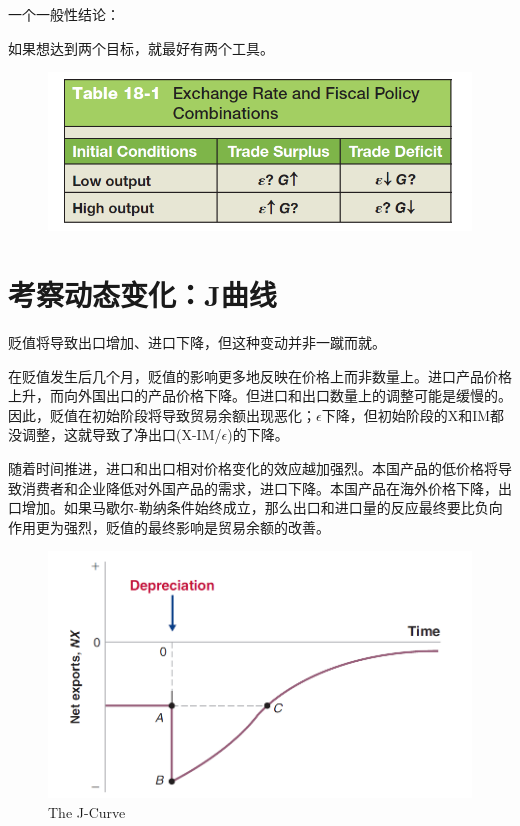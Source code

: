 \documentclass{article}
\begin{document}
\hspace*{\fill}

一个一般性结论：

如果想达到两个目标，就最好有两个工具。

\begin{figure}[H] %
	\centering %
	\includegraphics[width=1\textwidth]{18_8} %
	\caption{} %
	\label{Fig.main8} %
\end{figure}

\section{考察动态变化：J曲线}

贬值将导致出口增加、进口下降，但这种变动并非一蹴而就。

在贬值发生后几个月，贬值的影响更多地反映在价格上而非数量上。进口产品价格上升，而向外国出口的产品价格下降。但进口和出口数量上的调整可能是缓慢的。因此，贬值在初始阶段将导致贸易余额出现恶化；$\epsilon$下降，但初始阶段的X和IM都没调整，这就导致了净出口(X-IM/$\epsilon$)的下降。

随着时间推进，进口和出口相对价格变化的效应越加强烈。本国产品的低价格将导致消费者和企业降低对外国产品的需求，进口下降。本国产品在海外价格下降，出口增加。如果马歇尔-勒纳条件始终成立，那么出口和进口量的反应最终要比负向作用更为强烈，贬值的最终影响是贸易余额的改善。

\begin{figure}[H] %
	\centering %
	\includegraphics[width=1\textwidth]{18_9} %
	\caption{The J-Curve} %
	\label{Fig.main9} %
\end{figure}
\end{document}

